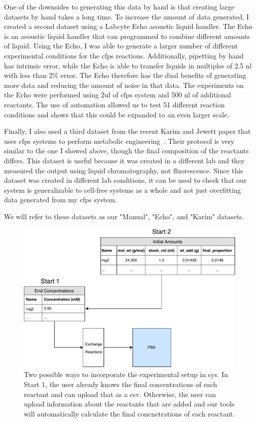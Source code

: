 One of the downsides to generating this data by hand is that creating large datasets by hand takes a long time.
To increase the amount of data generated, I created a second dataset using a Labcyte Echo acoustic liquid handler.
The Echo is an acoustic liquid handler that can programmed to combine different amounts of liquid.
Using the Echo, I was able to generate a larger number of different experimental conditions for the \gls{cfps} reactions.
Additionally, pipetting by hand has intrinsic error, while the Echo is able to transfer liquids in multiples of 2.5 \gls{nl} with less than 2\% error.
The Echo therefore has the dual benefits of generating more data and reducing the amount of noise in that data.
The experiments on the Echo were performed using 2\gls{ul} of \gls{cfps} system and 500 \gls{nl} of additional reactants.
The use of automation allowed us to test 51 different reaction conditions and shows that this could be expanded to an even larger scale.

Finally, I also used a third dataset from the recent Karim and Jewett paper that uses \gls{cfps} systems to perform metabolic engineering~\cite{karim2018controlling}.
Their protocol is very similar to the one I showed above, though the final composition of the reactants differs.
This dataset is useful because it was created in a different lab and they measured the output using liquid chromatography, not fluorescence.
Since this dataset was created in different lab conditions, it can be used to check that our system is generalizable to cell-free systems as a whole and not just overfitting data generated from my \gls{cfps} system.

We will refer to these datasets as our "Manual", "Echo", and "Karim" datasets.

\begin{figure}[t!]
\begin{center}
\includegraphics[width=\textwidth]{figs/DataIngestion.pdf}
\caption[Data ingestion part of \gls{sys}]{Two possible ways to incorporate the experimental setup in \gls{sys}.
In Start 1, the user already knows the final concentrations of each reactant and can upload that as a \gls{csv}.
Otherwise, the user can upload information about the reactants that are added and our tools will automatically calculate the final concnetrations of each reactant.}
\label{fig:ingest}
\end{center}
\end{figure}

